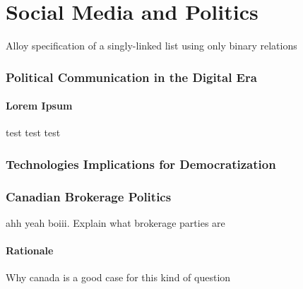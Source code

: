 \chapter{Social Media and Politics}\label{ch:SMandPolitics}

    \begin{Listing}[H]
    \caption{Alloy specification of a singly-linked list using only binary relations}
    \label{list:SimpleList1}
    \end{Listing}


\subsection{Political Communication in the Digital Era}

\subsubsection{Lorem Ipsum}

test test test

\subsection{Technologies Implications for Democratization}

\subsection{Canadian Brokerage Politics}

ahh yeah boiii. Explain what brokerage parties are

\subsubsection{Rationale}

Why canada is a good case for this kind of question